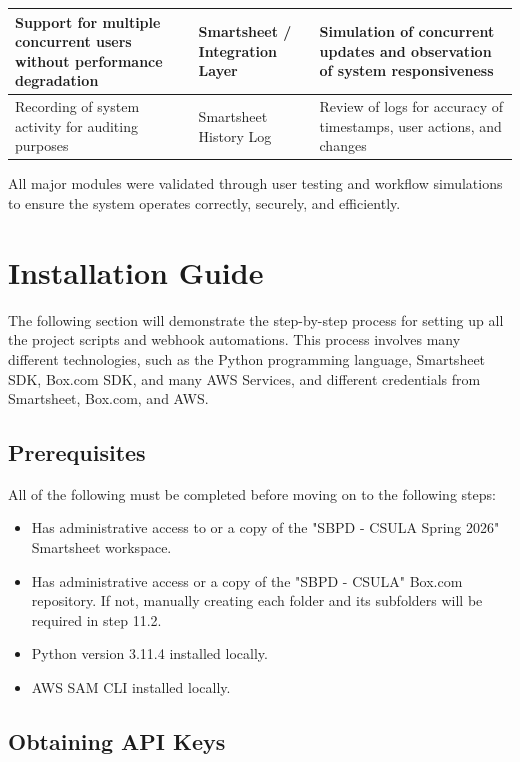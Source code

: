 \documentclass[12pt]{article}
\begin{document}
\begin{tabular}{|p{5cm}|p{4cm}|p{7cm}|}
Support for multiple concurrent users without performance degradation &
Smartsheet / Integration Layer &
Simulation of concurrent updates and observation of system responsiveness \\ \hline

Recording of system activity for auditing purposes &
Smartsheet History Log &
Review of logs for accuracy of timestamps, user actions, and changes \\ \hline

\end{tabular}

\noindent
All major modules were validated through user testing and workflow simulations to ensure the system operates correctly, securely, and efficiently.

\section{Installation Guide}
The following section will demonstrate the step-by-step process for setting up all the project scripts and webhook automations. This process involves many different technologies, such as the Python programming language, Smartsheet SDK, Box.com SDK, and many AWS Services, and different credentials from Smartsheet, Box.com, and AWS.

\subsection{Prerequisites}
All of the following must be completed before moving on to the following steps:
\begin{itemize}
    \item Has administrative access to or a copy of the "SBPD - CSULA Spring 2026" Smartsheet workspace.
    \item Has administrative access or a copy of the "SBPD - CSULA" Box.com repository. If not, manually creating each folder and its subfolders will be required in step 11.2.
    \item Python version 3.11.4 installed locally.
    \item AWS SAM CLI installed locally.
\end{itemize}

\subsection{Obtaining API Keys}
\end{document}
